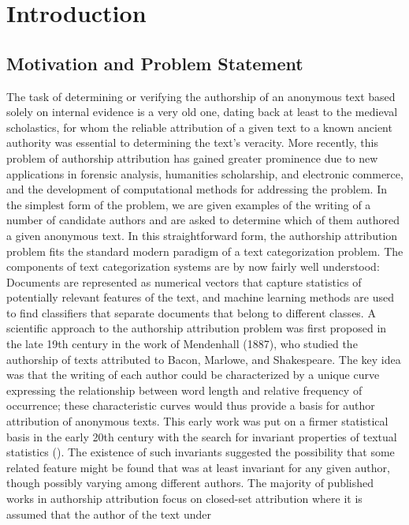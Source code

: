 \chapter{Introduction}
\section{Motivation and Problem Statement}
The task of determining or verifying the authorship of an anonymous text based solely on internal evidence is a very old one, dating back at least to the medieval scholastics, for whom the reliable attribution of a given text to a known ancient authority was essential to determining the text’s veracity. More recently, this problem of authorship attribution has gained greater prominence due to new applications in forensic analysis, humanities scholarship, and electronic commerce, and the development of computational methods for addressing the problem.
In the simplest form of the problem, we are given examples
of the writing of a number of candidate authors and are asked
to determine which of them authored a given anonymous
text. In this straightforward form, the authorship attribution
problem fits the standard modern paradigm of a text categorization problem. The components of text categorization systems are by
now fairly well understood: Documents are represented as
numerical vectors that capture statistics of potentially relevant features of the text, and machine learning methods are
used to find classifiers that separate documents that belong
to different classes.
A scientific approach to the authorship attribution problem was first proposed in the late 19th century in the work of Mendenhall (1887), who studied the authorship of texts attributed to Bacon, Marlowe, and Shakespeare.
The key idea was that
the writing of each author could be characterized by a unique
curve expressing the relationship between word length and
relative frequency of occurrence; these characteristic curves
would thus provide a basis for author attribution of anonymous texts. This early work was put on a firmer statistical
basis in the early 20th century with the search for invariant properties of textual statistics \citeauthor{zipf1932selected} (\citeyear{zipf1932selected}). The existence
of such invariants suggested the possibility that some related
feature might be found that was at least invariant for any given
author, though possibly varying among different authors.
The majority of published works in authorship
attribution focus on closed-set attribution where
it is assumed that the author of the text under
